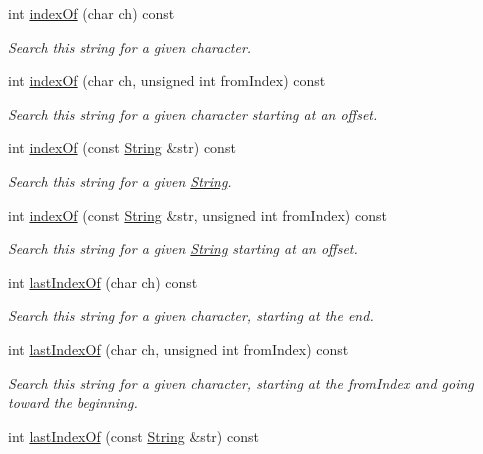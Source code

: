 \begin{DoxyCompactItemize}
int \hyperlink{class_string_aaf945bda436edaba02fccffbdf3936c1}{index\+Of} (char ch) const
\begin{DoxyCompactList}\small\item\em Search this string for a given character. \end{DoxyCompactList}\item 
int \hyperlink{class_string_a0a9cb3d76e6e9b7cd1d8666cc84149ea}{index\+Of} (char ch, unsigned int from\+Index) const
\begin{DoxyCompactList}\small\item\em Search this string for a given character starting at an offset. \end{DoxyCompactList}\item 
int \hyperlink{class_string_ab2fac51c5e56215d0b92a70cce39d966}{index\+Of} (const \hyperlink{class_string}{String} \&str) const
\begin{DoxyCompactList}\small\item\em Search this string for a given \hyperlink{class_string}{String}. \end{DoxyCompactList}\item 
int \hyperlink{class_string_aecbe2471a60329e53d31bd85c24c38a9}{index\+Of} (const \hyperlink{class_string}{String} \&str, unsigned int from\+Index) const
\begin{DoxyCompactList}\small\item\em Search this string for a given \hyperlink{class_string}{String} starting at an offset. \end{DoxyCompactList}\item 
int \hyperlink{class_string_a63a465c7d1e67129b04cf4693b756e5b}{last\+Index\+Of} (char ch) const
\begin{DoxyCompactList}\small\item\em Search this string for a given character, starting at the end. \end{DoxyCompactList}\item 
int \hyperlink{class_string_af9b32bb5cf68844c04792b4368f69883}{last\+Index\+Of} (char ch, unsigned int from\+Index) const
\begin{DoxyCompactList}\small\item\em Search this string for a given character, starting at the from\+Index and going toward the beginning. \end{DoxyCompactList}\item 
int \hyperlink{class_string_aa696010f90d06e0caceeb847ab3ce689}{last\+Index\+Of} (const \hyperlink{class_string}{String} \&str) const

\end{DoxyCompactItemize}
